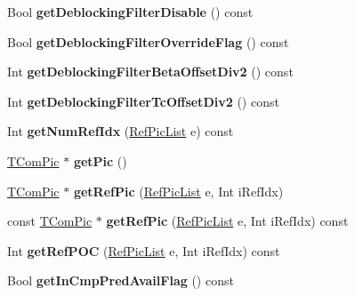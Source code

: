 \begin{DoxyCompactItemize}
Bool {\bfseries get\+Deblocking\+Filter\+Disable} () const
\item 
\mbox{\label{class_t_com_slice_a1e659e793dde5f7b2d03ec276313ebf1}} 
Bool {\bfseries get\+Deblocking\+Filter\+Override\+Flag} () const
\item 
\mbox{\label{class_t_com_slice_a3b838c9a7c4c88ec24a5751729e3a332}} 
Int {\bfseries get\+Deblocking\+Filter\+Beta\+Offset\+Div2} () const
\item 
\mbox{\label{class_t_com_slice_aef6c9ef147b1ae9c7836de9e0e0ed391}} 
Int {\bfseries get\+Deblocking\+Filter\+Tc\+Offset\+Div2} () const
\item 
\mbox{\label{class_t_com_slice_adb557a6dce957b655a56f695a48fc2ec}} 
Int {\bfseries get\+Num\+Ref\+Idx} (\hyperlink{_type_def_8h_a93cea48eb9dcfd661168dee82e41b384}{Ref\+Pic\+List} e) const
\item 
\mbox{\label{class_t_com_slice_a22318d8d67d332c2c0820e8fb594e766}} 
\hyperlink{class_t_com_pic}{T\+Com\+Pic} $\ast$ {\bfseries get\+Pic} ()
\item 
\mbox{\label{class_t_com_slice_adfa1edb51f76771b5bc1788dab090e17}} 
\hyperlink{class_t_com_pic}{T\+Com\+Pic} $\ast$ {\bfseries get\+Ref\+Pic} (\hyperlink{_type_def_8h_a93cea48eb9dcfd661168dee82e41b384}{Ref\+Pic\+List} e, Int i\+Ref\+Idx)
\item 
\mbox{\label{class_t_com_slice_a941812b388ca34808823f1eb2616b2a6}} 
const \hyperlink{class_t_com_pic}{T\+Com\+Pic} $\ast$ {\bfseries get\+Ref\+Pic} (\hyperlink{_type_def_8h_a93cea48eb9dcfd661168dee82e41b384}{Ref\+Pic\+List} e, Int i\+Ref\+Idx) const
\item 
\mbox{\label{class_t_com_slice_a0441bb216541d28b2b62a11a406d36bc}} 
Int {\bfseries get\+Ref\+P\+OC} (\hyperlink{_type_def_8h_a93cea48eb9dcfd661168dee82e41b384}{Ref\+Pic\+List} e, Int i\+Ref\+Idx) const
\item 
\mbox{\label{class_t_com_slice_ad4a9eff0f1e150b42f31640bc16cd89e}} 
Bool {\bfseries get\+In\+Cmp\+Pred\+Avail\+Flag} () const

\end{DoxyCompactItemize}
